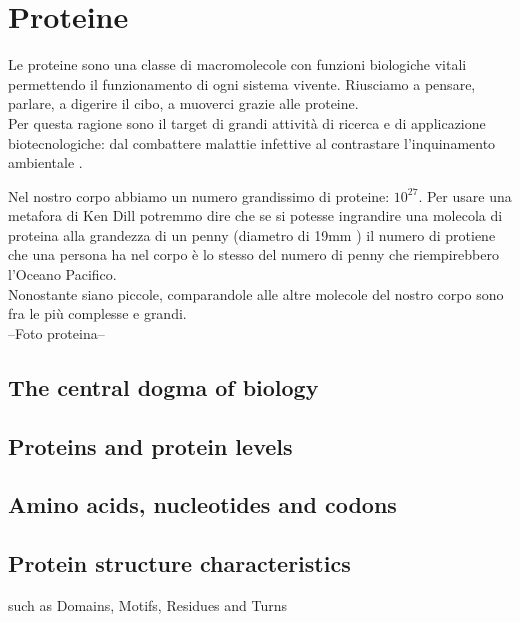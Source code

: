 \chapter{Proteine}
Le proteine sono una classe di macromolecole con funzioni biologiche vitali permettendo il funzionamento di ogni sistema vivente. Riusciamo a pensare, parlare, a digerire il cibo, a muoverci grazie alle proteine.\\

Per questa ragione sono il target di grandi attività di ricerca e di applicazione biotecnologiche: dal combattere malattie infettive \cite{batool2019structure} al contrastare l'inquinamento ambientale \cite{knott2020characterization}.


Nel nostro corpo abbiamo un numero grandissimo di proteine: $10^{27}$. Per usare una metafora di Ken Dill \cite{TalksDill2013Oct} potremmo dire che se si potesse ingrandire una molecola di proteina alla grandezza di un penny (diametro di 19mm \cite{CentWikipedia}) il numero di protiene che una persona ha nel corpo è lo stesso del numero di penny che riempirebbero l'Oceano Pacifico.\\

Nonostante siano piccole, comparandole alle altre molecole del nostro corpo sono fra le più complesse e grandi.\\

--Foto proteina--\\





\section{The central dogma of biology}

\section{Proteins and protein levels}

\section{Amino acids, nucleotides and codons}

\section{Protein structure characteristics}
such as Domains, Motifs, Residues and Turns

